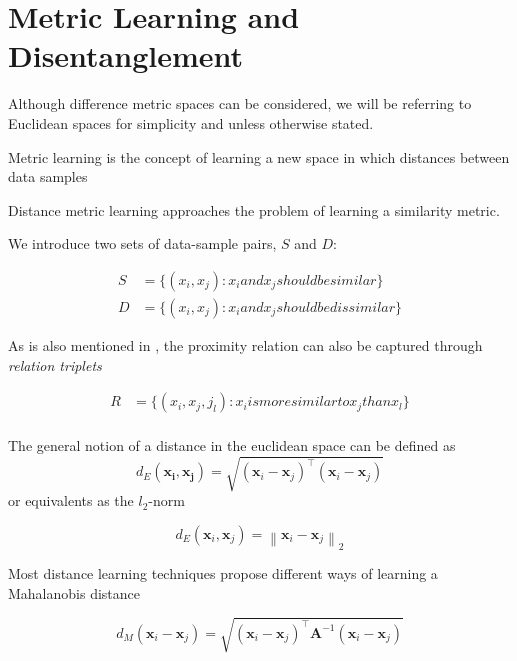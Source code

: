\documentclass[a4paper,12pt,twoside,openright]{report}
\begin{document}
\section{Metric Learning and Disentanglement}

Although difference metric spaces can be considered, we will be referring to Euclidean spaces for simplicity and unless otherwise stated.

Metric learning is the concept of learning a new space in which distances between data samples 

Distance metric learning approaches the problem of learning a similarity metric.

We introduce two sets of data-sample pairs, $S$ and $D$:

\begin{align}
S &= \{ (x_i, x_j) : x_i and x_j should be similar\} \\
D &= \{ (x_i, x_j) : x_i and x_j should be dissimilar\}
\end{align}

As is also mentioned in \cite{moutafis17}, the proximity relation can also be captured through \textit{relation triplets}

\begin{align}
R &= \{ (x_i, x_j, j_l) : x_i is more similar to x_j than x_l \} \\
\end{align}

The general notion of a distance in the euclidean space can be defined as 
\begin{equation}
d_{E}\left(\boldsymbol{x}_{\boldsymbol{i}}, \boldsymbol{x}_{\boldsymbol{j}}\right)=\sqrt{\left(\boldsymbol{x}_{i}-\boldsymbol{x}_{j}\right)^{\top}\left(\boldsymbol{x}_{i}-\boldsymbol{x}_{j}\right)}
\end{equation}
or equivalents as the $l_2$-norm

\begin{equation}
d_{E}\left(\boldsymbol{x}_{i}, \boldsymbol{x}_{j}\right)=\left\|\boldsymbol{x}_{i}-\boldsymbol{x}_{j}\right\|_{2}
\end{equation}

Most distance learning techniques propose different ways of learning a Mahalanobis distance \cite{mahalanobis36}

\begin{equation}
d_{M}\left(\boldsymbol{x}_{i}-\boldsymbol{x}_{j}\right)=\sqrt{\left(\boldsymbol{x}_{i}-\boldsymbol{x}_{j}\right)^{\top} \boldsymbol{A}^{-1}\left(\boldsymbol{x}_{i}-\boldsymbol{x}_{j}\right)}
\end{equation}
\end{document}
